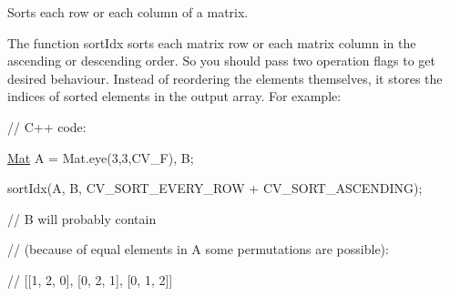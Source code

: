 Sorts each row or each column of a matrix.

The function {\ttfamily sort\+Idx} sorts each matrix row or each matrix column in the ascending or descending order. So you should pass two operation flags to get desired behaviour. Instead of reordering the elements themselves, it stores the indices of sorted elements in the output array. For example\+: {\ttfamily }

{\ttfamily }

{\ttfamily }

{\ttfamily // C++ code\+:}

{\ttfamily }

{\ttfamily }

{\ttfamily \mbox{\hyperlink{classorg_1_1opencv_1_1core_1_1_mat}{Mat}} A = Mat.\+eye(3,3,\+C\+V\+\_\+F), B;}

{\ttfamily }

{\ttfamily }

{\ttfamily sort\+Idx(A, B, C\+V\+\_\+\+S\+O\+R\+T\+\_\+\+E\+V\+E\+R\+Y\+\_\+\+R\+OW + C\+V\+\_\+\+S\+O\+R\+T\+\_\+\+A\+S\+C\+E\+N\+D\+I\+NG);}

{\ttfamily }

{\ttfamily }

{\ttfamily // B will probably contain}

{\ttfamily }

{\ttfamily }

{\ttfamily // (because of equal elements in A some permutations are possible)\+:}

{\ttfamily }

{\ttfamily }

{\ttfamily // \mbox{[}\mbox{[}1, 2, 0\mbox{]}, \mbox{[}0, 2, 1\mbox{]}, \mbox{[}0, 1, 2\mbox{]}\mbox{]}}

{\ttfamily }

